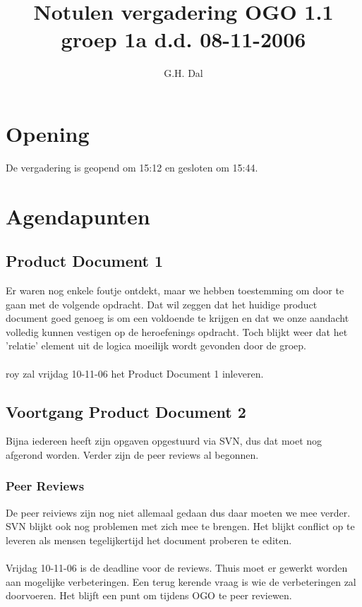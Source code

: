 \documentclass[11pt]{article}
\title{Notulen vergadering OGO 1.1 groep 1a d.d. 08-11-2006}
\author{G.H. Dal}
\date{}
\begin{document}
\maketitle

\section{Opening}

De vergadering is geopend om 15:12 en gesloten om 15:44.

\section{Agendapunten}

\subsection*{Product Document 1}
Er waren nog enkele foutje ontdekt, maar we hebben toestemming om
door te gaan met de volgende opdracht. Dat wil zeggen dat het
huidige product document goed genoeg is om een voldoende te krijgen
en dat we onze aandacht volledig kunnen vestigen op de heroefenings
opdracht. Toch blijkt weer dat het 'relatie' element uit de logica
moeilijk wordt gevonden door de groep.\\\\
roy zal vrijdag 10-11-06 het Product Document 1 inleveren.

\subsection*{Voortgang Product Document 2}
Bijna iedereen heeft zijn opgaven opgestuurd via SVN, dus dat moet
nog afgerond worden. Verder zijn de peer reviews al begonnen.

\subsubsection*{Peer Reviews}
De peer reiviews zijn nog niet allemaal gedaan dus daar moeten we
mee verder. SVN blijkt ook nog problemen met zich mee te brengen.
Het blijkt conflict op te leveren als mensen tegelijkertijd het
document
proberen te editen.\\\\

Vrijdag 10-11-06 is de deadline voor de reviews. Thuis moet er
gewerkt worden aan mogelijke verbeteringen. Een terug kerende vraag
is wie de verbeteringen zal doorvoeren. Het blijft een punt om
tijdens OGO te peer reviewen.
\end{document}
